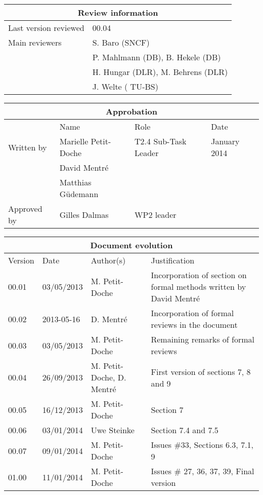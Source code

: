 \documentclass{template/openetcs_article}
\begin{document}
\begin{tabular}{|p{4.4cm}|p{8.7cm}|}
\hline
\multicolumn{2}{|c|}{Review information} \\
\hline
Last version reviewed & 00.04 \\
\hline
Main reviewers & S. Baro (SNCF) \\
& P. Mahlmann (DB), B. Hekele (DB)\\
& H. Hungar (DLR), M. Behrens (DLR) \\
& J. Welte ( TU-BS) \\
\hline
\end{tabular}

\begin{tabular}{|p{2.2cm}|p{4cm}|p{4cm}|p{2cm}|}
\hline
\multicolumn{4}{|c|}{Approbation} \\
\hline
  &  Name & Role & Date   \\
\hline  
Written by    &  Marielle Petit-Doche & T2.4 Sub-Task Leader  & January 2014 \\
& David Mentré & & \\
& Matthias Güdemann & & \\
\hline
Approved by & Gilles Dalmas & WP2 leader & \\
\hline
\end{tabular}

\begin{tabular}{|p{2.2cm}|p{2cm}|p{3cm}|p{5cm}|}
\hline
\multicolumn{4}{|c|}{Document evolution} \\
\hline
Version &  Date & Author(s) & Justification  \\
\hline  
00.01 & 03/05/2013 & M. Petit-Doche &  Incorporation of section on formal methods written by David Mentré \\
\hline  
00.02 & 2013-05-16 & D. Mentré &  Incorporation of formal reviews in
the document \\
\hline  
00.03 & 03/05/2013 & M. Petit-Doche &  Remaining remarks of formal reviews \\
\hline  
00.04 & 26/09/2013 & M. Petit-Doche, D. Mentré & First version of sections 7, 8 and 9   \\
\hline  
00.05 & 16/12/2013 & M. Petit-Doche & Section 7  \\
\hline  
00.06 & 03/01/2014 & Uwe Steinke & Section 7.4 and 7.5  \\
\hline  
00.07 & 09/01/2014 & M. Petit-Doche & Issues \#33, Sections 6.3, 7.1, 9  \\
\hline  
01.00 & 11/01/2014 & M. Petit-Doche & Issues \# 27, 36, 37, 39, Final version  \\
\hline  
\end{tabular}
\end{document}
